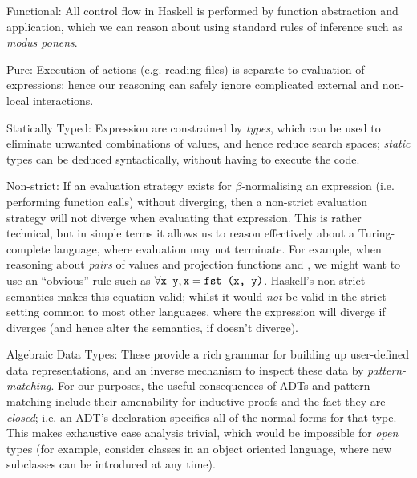 \begin{description}

\item{Functional}: All control flow in Haskell is performed by function
  abstraction and application, which we can reason about using standard rules of
  inference such as \emph{modus ponens}.

\item{Pure}: Execution of actions (e.g. reading files) is separate to evaluation
  of expressions; hence our reasoning can safely ignore complicated external and
  non-local interactions.

\item{Statically Typed}: Expression are constrained by \emph{types}, which can
  be used to eliminate unwanted combinations of values, and hence reduce search
  spaces; \emph{static} types can be deduced syntactically, without having to
  execute the code.

\item{Non-strict}: If an evaluation strategy exists for $\beta$-normalising an
  expression (i.e. performing function calls) without diverging, then a
  non-strict evaluation strategy will not diverge when evaluating that
  expression. This is rather technical, but in simple terms it allows us to
  reason effectively about a Turing-complete language, where evaluation may not
  terminate. For example, when reasoning about \emph{pairs} of values  and projection functions  and , we might want to use an
  ``obvious'' rule such as
  $\forall \text{\texttt{x y}}, \text{\texttt{x}} = \text{\texttt{fst (x, y)}}$. Haskell's
  non-strict semantics makes this equation valid; whilst it would \emph{not} be
  valid in the strict setting common to most other languages, where the
  expression  will diverge if  diverges (and hence alter
  the semantics, if  doesn't diverge).

\item{Algebraic Data Types}: These provide a rich grammar for building up
  user-defined data representations, and an inverse mechanism to inspect these
  data by \emph{pattern-matching}. For our purposes, the useful consequences of
  ADTs and pattern-matching include their amenability for inductive proofs and
  the fact they are \emph{closed}; i.e. an ADT's declaration specifies all of
  the normal forms for that type. This makes exhaustive case analysis trivial,
  which would be impossible for \emph{open} types (for example, consider classes
  in an object oriented language, where new subclasses can be introduced at any
  time).


\end{description}
